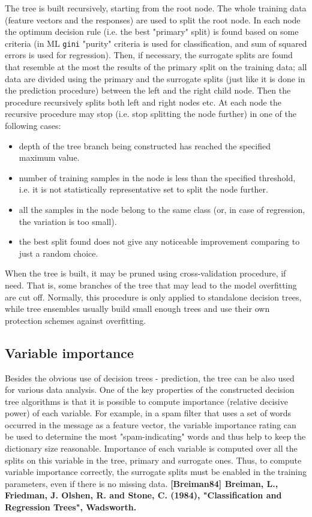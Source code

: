 The tree is built recursively, starting from the root node. The whole training data (feature vectors and the responses) are used to split the root node. In each node the optimum decision rule (i.e. the best "primary" split) is found based on some criteria (in ML \texttt{gini} "purity" criteria is used for classification, and sum of squared errors is used for regression). Then, if necessary, the surrogate splits are found that resemble at the most the results of the primary split on the training data; all data are divided using the primary and the surrogate splits (just like it is done in the prediction procedure) between the left and the right child node. Then the procedure recursively splits both left and right nodes etc. At each node the recursive procedure may stop (i.e. stop splitting the node further) in one of the following cases:
\begin{itemize}
\item{depth of the tree branch being constructed has reached the specified maximum value.}
\item{number of training samples in the node is less than the specified threshold, i.e. it is not statistically representative set to split the node further.}
\item{all the samples in the node belong to the same class (or, in case of regression, the variation is too small).}
\item{the best split found does not give any noticeable improvement comparing to just a random choice.}
\end{itemize}
When the tree is built, it may be pruned using cross-validation procedure, if need. That is, some branches of the tree that may lead to the model overfitting are cut off. Normally, this procedure is only applied to standalone decision trees, while tree ensembles usually build small enough trees and use their own protection schemes against overfitting.

\subsection{Variable importance}

Besides the obvious use of decision trees - prediction, the tree can be also used for various data analysis. One of the key properties of the constructed decision tree algorithms is that it is possible to compute importance (relative decisive power) of each variable. For example, in a spam filter that uses a set of words occurred in the message as a feature vector, the variable importance rating can be used to determine the most "spam-indicating" words and thus help to keep the dictionary size reasonable.
\newline
\newline
Importance of each variable is computed over all the splits on this variable in the tree, primary and surrogate ones. Thus, to compute variable importance correctly, the surrogate splits must be enabled in the training parameters, even if there is no missing data.
\newline
\newline
\textbf{[Breiman84] Breiman, L., Friedman, J. Olshen, R. and Stone, C. (1984), "Classification and Regression Trees", Wadsworth.}


